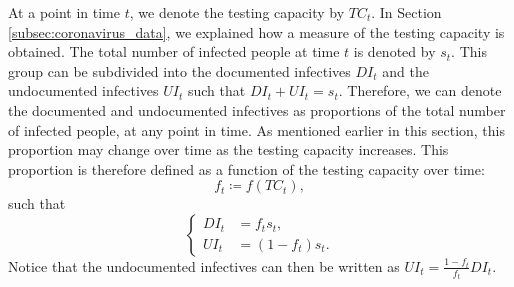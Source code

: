 \documentclass[12pt]{article}
\begin{document}
	At a point in time $t$, we denote the testing capacity by $TC_t$. In Section \ref{subsec:coronavirus_data}, we explained how a measure of the testing capacity is obtained. The total number of infected people at time $t$ is denoted by $s_t$. This group can be subdivided into the documented infectives $DI_t$ and the undocumented infectives $UI_t$ such that $DI_t + UI_t = s_t$. Therefore, we can denote the documented and undocumented infectives as proportions of the total number of infected people, at any point in time. As mentioned earlier in this section, this proportion may change over time as the testing capacity increases. This proportion is therefore defined as a function of the testing capacity over time:
    	\begin{equation} \label{eq:f_t}
    	f_t \coloneqq f(TC_t),
    	\end{equation}
	such that
    	\begin{equation*}
        	\begin{cases}
            	DI_t &= f_ts_t, \\
            	UI_t &= (1-f_t)s_t.
        	\end{cases}
    	\end{equation*}
	Notice that the undocumented infectives can then be written as $UI_t = \frac{1-f_t}{f_t}DI_t$. \\
	
\end{document}
